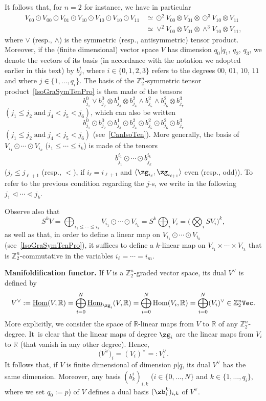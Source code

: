 \documentclass[pdftex]{sigma}%
\newcommand{\op}[1]{\operatorname{#1}}
\newcommand{\R}{{\mathbb R}}
\newcommand{\Z}{{\mathbb Z}}
\def\ul{\underline}
\def\la{\langle}
\def\ul{\underline}
\newcommand{\0}{\otimes}
\numberwithin{equation}{section}
\begin{document}
It follows that, for $n=2$ for instance, we have in particular
\begin{align}
V_{00}\odot V_{00}\odot V_{01}\odot V_{10}\odot V_{10}\odot V_{10}\odot V_{11}&\simeq \odot^2 V_{00}\0 V_{01}\0\odot^3V_{10}\0 V_{11}\nonumber
\\
&\simeq\vee^2 V_{00}\0 V_{01}\0\wedge^3V_{10}\0 V_{11},\label{IsoGraSymTenPro}
\end{align}
where $\vee$ (resp., $\wedge$) is the symmetric (resp., antisymmetric) tensor product. Moreover, if the (finite dimensional) vector space $V$ has dimension $q_0|q_1$, $q_2$, $q_3$, we denote the vectors of its basis (in accordance with the notation we adopted earlier in this text) by $b^i_{j}$, where $i\in\{0,1,2,3\}$ refers to the degrees $00$, $01$, $10$, $11$ and where $j\in\{1,\dots,q_i\}$. The basis of the $\Z_2^n$-symmetric tensor product~\eqref{IsoGraSymTenPro} is then made of the tensors
\[
b^0_{j_1}\vee b^0_{j_2}\0 b^1_{j_3}\0 b^2_{j_4}\wedge b^2_{j_5}\wedge b^2_{j_6}\0 b^3_{j_7}
\]
$(j_1\le j_2\;\text{and}\;j_4<j_5<j_6)$, which can also be written
\[
b^0_{j_1}\odot b^0_{j_2}\odot b^1_{j_3}\odot b^2_{j_4}\odot b^2_{j_5}\odot b^2_{j_6}\odot b^3_{j_7}
\]
$(j_1\le j_2\;\text{and}\;j_4<j_5<j_6)$ (see~\eqref{CanIsoTen}). More generally, the basis of $V_{i_1}\odot\cdots\odot V_{i_k}$ ($i_1\le\cdots\le i_k$) is made of the tensors
\begin{gather}\label{BasGraSymTenAlg}
b^{i_1}_{j_1}\odot\cdots\odot b^{i_k}_{j_k}
\end{gather}
($j_\ell\le j_{\ell+1}$ (resp., $<$), if $i_\ell = i_{\ell+1}$ and $\la\zg_{i_\ell},\zg_{i_{\ell+1}}\rangle$ even (resp., odd)). To refer to the previous condition regarding the $j$-s, we write in the following $j_1\lhd\cdots\lhd j_k$.

Observe also that
\[
S^kV=\bigoplus_{i_1\le\cdots\le i_k}V_{i_1}\odot\cdots\odot V_{i_k}=S^k\bigoplus_i V_i=\bigg(\bigotimes_i SV_{i}\bigg)^k,
\]
as well as that, in order to define a linear map on $V_{i_1}\odot\cdots\odot V_{i_k}$ (see~\eqref{IsoGraSymTenPro}), it suffices to define a $k$-linear map on $V_{i_1}\times\cdots\times V_{i_k}$ that is $\Z_2^n$-commutative in the variables $i_\ell=\cdots=i_m$.

\medskip\noindent
{\bf Manifoldification functor.} If $V$ is a $\Z_2^n$-graded vector space, its dual $V^\vee$ is defined by
\[
V^\vee:=\ul{\op{Hom}}(V,\R)=\bigoplus_{i=0}^N\ul{\op{Hom}}_{\zg_i}(V,\R) =\bigoplus_{i=0}^N\op{Hom}(V_i,\R)=\bigoplus_{i=0}^N(V_i)^\vee\in\Z_2^n\tt Vec.
\]
More explicitly, we consider the space of $\R$-linear maps from $V$ to $\R$ of any $\Z_2^n$-degree. It~is clear that the linear maps of degree $\zg_i$ are the linear maps from $V_i$ to $\R$ (that vanish in any other degree). Hence,
\[
\big(V^\vee\big)_i=(V_i)^\vee=:V_i^\vee.
\]
It follows that, if $V$ is finite dimensional of dimension $p|\ul q$, its dual $V^\vee$ has the same dimension. Moreover, any basis $(b^i_k)_{i,k}$ ($i\in\{0,\dots, N\}$ and $k\in\{1,\dots, q_i\}$, where we set $q_0:= p$) of $V$ defines a dual basis $(\zb^k_i)_{i,k}$ of $V^\vee$.
\end{document}
